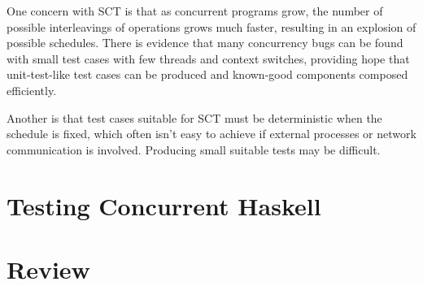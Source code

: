 One concern with SCT is that as concurrent programs grow, the number
of possible interleavings of operations grows much faster, resulting
in an explosion of possible schedules. There is evidence that many
concurrency bugs can be found with small test cases with few threads
and context switches\cite{pbound, dbound, empirical}, providing hope
that unit-test-like test cases can be produced and known-good
components composed efficiently.

Another is that test cases suitable for SCT must be deterministic when
the schedule is fixed, which often isn't easy to achieve if external
processes or network communication is involved. Producing small
suitable tests may be difficult.

\section{Testing Concurrent Haskell}
\label{sec:litrev-scthask}


\section{Review}
\label{sec:litrev-review}

